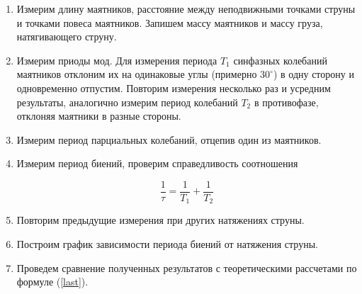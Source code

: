 \documentclass[14pt]{article}
\begin{document}
\begin{flushleft}
\begin{enumerate}
\item Измерим длину маятников, расстояние между неподвижными точками струны и точками повеса маятников. Запишем массу маятников и массу груза, натягивающего струну.
\item Измерим приоды мод. Для измерения периода $T_1$ синфазных колебаний маятников отклоним их на одинаковые углы (примерно $30^{\circ}$) в одну сторону и одновременно отпустим. Повторим измерения несколько раз и усредним результаты, аналогично измерим период колебаний $T_2$ в противофазе, отклоняя маятники в разные стороны.
\item Измерим период парциальных колебаний, отцепив один из маятников.
\item Измерим период биений, проверим справедливость соотношения

$$
	\frac{1}{\tau} = \frac{1}{T_1} + \frac{1}{T_2}
$$

\item Повторим предыдущие измерения при других натяжениях струны.
\item Построим график зависимости периода биений от натяжения струны.
\item Проведем сравнение полученных результатов с теоретическими рассчетами по формуле (\ref{last}).
\end{enumerate}
\end{flushleft}
\end{document}
